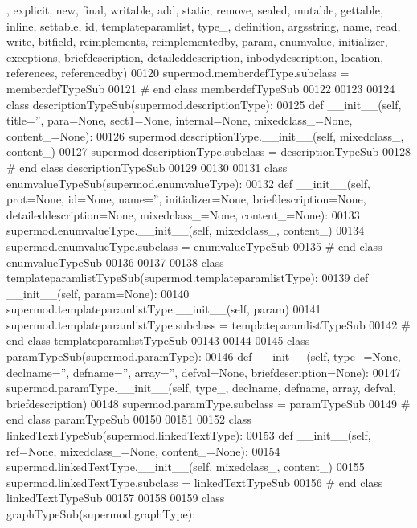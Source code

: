 \begin{DoxyCode}
      , explicit, new, final, writable, add, static, remove, sealed, mutable, gettable, inline, settable, id, 
      templateparamlist, type\_, definition, argsstring, name, read, write, bitfield, reimplements, reimplementedby, 
      param, enumvalue, initializer, exceptions, briefdescription, detaileddescription, inbodydescription, location,
       references, referencedby)
00120 supermod.memberdefType.subclass = memberdefTypeSub
00121 \textcolor{comment}{# end class memberdefTypeSub}
00122 
00123 
00124 \textcolor{keyword}{class }descriptionTypeSub(supermod.descriptionType):
00125     \textcolor{keyword}{def }__init__(self, title='', para=None, sect1=None, internal=None, mixedclass\_=None, content\_=None):
00126         supermod.descriptionType.\_\_init\_\_(self, mixedclass\_, content\_)
00127 supermod.descriptionType.subclass = descriptionTypeSub
00128 \textcolor{comment}{# end class descriptionTypeSub}
00129 
00130 
00131 \textcolor{keyword}{class }enumvalueTypeSub(supermod.enumvalueType):
00132     \textcolor{keyword}{def }__init__(self, prot=None, id=None, name='', initializer=None, briefdescription=None, 
      detaileddescription=None, mixedclass\_=None, content\_=None):
00133         supermod.enumvalueType.\_\_init\_\_(self, mixedclass\_, content\_)
00134 supermod.enumvalueType.subclass = enumvalueTypeSub
00135 \textcolor{comment}{# end class enumvalueTypeSub}
00136 
00137 
00138 \textcolor{keyword}{class }templateparamlistTypeSub(supermod.templateparamlistType):
00139     \textcolor{keyword}{def }__init__(self, param=None):
00140         supermod.templateparamlistType.\_\_init\_\_(self, param)
00141 supermod.templateparamlistType.subclass = templateparamlistTypeSub
00142 \textcolor{comment}{# end class templateparamlistTypeSub}
00143 
00144 
00145 \textcolor{keyword}{class }paramTypeSub(supermod.paramType):
00146     \textcolor{keyword}{def }__init__(self, type\_=None, declname='', defname='', array='', defval=None, briefdescription=None):
00147         supermod.paramType.\_\_init\_\_(self, type\_, declname, defname, array, defval, briefdescription)
00148 supermod.paramType.subclass = paramTypeSub
00149 \textcolor{comment}{# end class paramTypeSub}
00150 
00151 
00152 \textcolor{keyword}{class }linkedTextTypeSub(supermod.linkedTextType):
00153     \textcolor{keyword}{def }__init__(self, ref=None, mixedclass\_=None, content\_=None):
00154         supermod.linkedTextType.\_\_init\_\_(self, mixedclass\_, content\_)
00155 supermod.linkedTextType.subclass = linkedTextTypeSub
00156 \textcolor{comment}{# end class linkedTextTypeSub}
00157 
00158 
00159 \textcolor{keyword}{class }graphTypeSub(supermod.graphType):

\end{DoxyCode}
